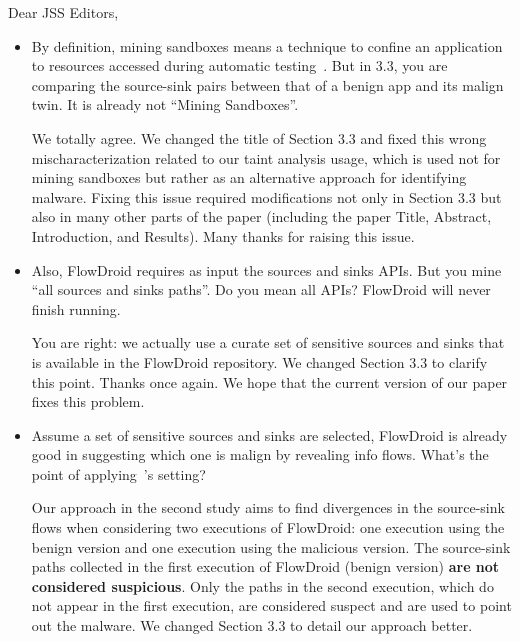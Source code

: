 \documentclass[12pt,english]{scrartcl}
\begin{document}
\begin{letter}{Dear JSS Editors,}
\begin{itemize}
\vspace{0.2cm}

\item By definition, mining sandboxes means a technique to confine an application to resources accessed during automatic 
testing~\cite{jamrozikZ16}. But in 3.3, you are comparing the source-sink pairs between that of a benign app and its malign twin. It is already not ``Mining Sandboxes''.

\vspace{0.2cm}

{\color{blue}{\bf Answer.} We totally agree. We changed the title of Section 3.3 and fixed this wrong mischaracterization related to our taint analysis usage, which is used not for mining sandboxes but rather as an alternative approach for identifying malware. Fixing this issue required modifications not only in Section 3.3 but also in many other parts of the paper (including the paper Title, Abstract, Introduction, and Results). Many thanks for raising this issue.}


\vspace{0.2cm}

\item Also, FlowDroid requires as input the sources and sinks APIs. But you mine ``all sources and sinks 
paths''. Do you mean all APIs? FlowDroid will never finish running. 

\vspace{0.2cm}

{\color{blue}{\bf Answer.} You are right: we actually use a curate set of sensitive sources and sinks
  that is available in the FlowDroid repository.
  We changed Section 3.3 to clarify this point. Thanks once again.
  We hope that the current version of our paper fixes this problem.}

\vspace{0.2cm}
  
\item Assume a set of sensitive sources and sinks are selected, 
  FlowDroid is already good in suggesting which one is malign by revealing info flows. What's the point of
  applying~\cite{jamrozikZ16}'s setting?


\vspace{0.2cm}

{\color{blue}{\bf Answer.} Our approach in the second study aims to find divergences in the source-sink
  flows when considering two executions of FlowDroid: one execution using the benign version and
  one execution using the malicious version. The source-sink paths collected
  in the first execution of FlowDroid (benign version)
  {\bf are not considered suspicious}. Only the paths in the second execution, which do not appear in the first execution, are considered suspect and are used to point out the malware. We changed Section 3.3 to
  detail our approach better.}


\end{itemize}
\end{letter}
\end{document}
